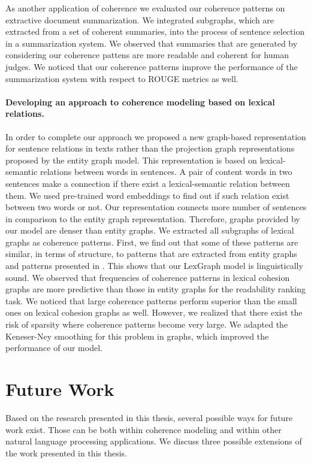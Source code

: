 As another application of coherence we evaluated our coherence patterns on extractive document summarization. 
We integrated subgraphs, which are extracted from a set of coherent summaries, into the process of sentence selection in a summarization system. 
We observed that summaries that are generated by considering our coherence pattens are more readable and coherent for human judges. 
We noticed that our coherence patterns improve the performance of the summarization system with respect to ROUGE metrics as well. 

\paragraph{Developing an approach to coherence modeling based on lexical relations.} 
In order to complete our approach we proposed a new graph-based representation for sentence relations in texts rather than the projection graph representations proposed by the entity graph model.   
This representation is based on lexical-semantic relations between words in sentences.
A pair of content words in two sentences make a connection if there exist a lexical-semantic relation between them. 
We used pre-trained word embeddings to find out if such relation exist between two words or not.  
Our representation connects more number of sentences in comparison to the entity graph representation. 
Therefore, graphs provided by our model are denser than entity graphs. 
We extracted all subgraphs of lexical graphs as coherence patterns. 
First, we find out that some of these patterns are similar, in terms of structure, to patterns that are extracted from entity graphs and patterns presented in .
This shows that our LexGraph model is linguistically sound. 
We observed that frequencies of coherence patterns in lexical cohesion graphs are more predictive than those in entity graphs for the readability ranking task. 
We noticed that large coherence patterns perform superior than the small ones on lexical cohesion graphs as well.  
However, we realized that there exist the risk of sparsity where coherence patterns become very large. 
We adapted the Keneser-Ney smoothing for this problem in graphs, which improved the performance of our model. 

\section{Future Work}
\label{sec:conc-future_work}

Based on the research presented in this thesis, several possible ways for future work exist. 
Those can be both within coherence modeling and within other natural language processing applications.  
We discuss three possible extensions of the work presented in this thesis. 

